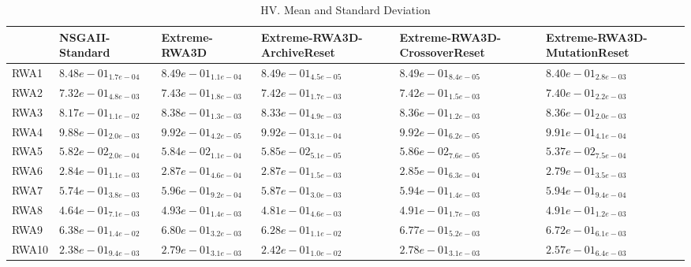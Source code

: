 \documentclass{article}
\begin{document}
\begin{table}
\caption{HV. Mean and Standard Deviation}
\label{table: HV}
\centering
\begin{scriptsize}
\begin{tabular}{llllll}
\hline & NSGAII-Standard & Extreme-RWA3D & Extreme-RWA3D-ArchiveReset & Extreme-RWA3D-CrossoverReset &  Extreme-RWA3D-MutationReset\\
\hline 
RWA1 & $  8.48e-01_{ 1.7e-04}$ & $  8.49e-01_{ 1.1e-04}$ & \cellcolor{gray95}$  8.49e-01_{ 4.5e-05}$ & \cellcolor{gray25}$  8.49e-01_{ 8.4e-05}$ & $  8.40e-01_{ 2.8e-03}$ \\
RWA2 & $  7.32e-01_{ 4.8e-03}$ & \cellcolor{gray95}$  7.43e-01_{ 1.8e-03}$ & \cellcolor{gray25}$  7.42e-01_{ 1.7e-03}$ & $  7.42e-01_{ 1.5e-03}$ & $  7.40e-01_{ 2.2e-03}$ \\
RWA3 & $  8.17e-01_{ 1.1e-02}$ & \cellcolor{gray95}$  8.38e-01_{ 1.3e-03}$ & $  8.33e-01_{ 4.9e-03}$ & $  8.36e-01_{ 1.2e-03}$ & \cellcolor{gray25}$  8.36e-01_{ 2.0e-03}$ \\
RWA4 & $  9.88e-01_{ 2.0e-03}$ & \cellcolor{gray95}$  9.92e-01_{ 4.2e-05}$ & $  9.92e-01_{ 3.1e-04}$ & \cellcolor{gray25}$  9.92e-01_{ 6.2e-05}$ & $  9.91e-01_{ 4.1e-04}$ \\
RWA5 & $  5.82e-02_{ 2.0e-04}$ & $  5.84e-02_{ 1.1e-04}$ & \cellcolor{gray25}$  5.85e-02_{ 5.1e-05}$ & \cellcolor{gray95}$  5.86e-02_{ 7.6e-05}$ & $  5.37e-02_{ 7.5e-04}$ \\
RWA6 & $  2.84e-01_{ 1.1e-03}$ & \cellcolor{gray25}$  2.87e-01_{ 4.6e-04}$ & \cellcolor{gray95}$  2.87e-01_{ 1.5e-03}$ & $  2.85e-01_{ 6.3e-04}$ & $  2.79e-01_{ 3.5e-03}$ \\
RWA7 & $  5.74e-01_{ 3.8e-03}$ & \cellcolor{gray95}$  5.96e-01_{ 9.2e-04}$ & $  5.87e-01_{ 3.0e-03}$ & $  5.94e-01_{ 1.4e-03}$ & \cellcolor{gray25}$  5.94e-01_{ 9.4e-04}$ \\
RWA8 & $  4.64e-01_{ 7.1e-03}$ & \cellcolor{gray95}$  4.93e-01_{ 1.4e-03}$ & $  4.81e-01_{ 4.6e-03}$ & \cellcolor{gray25}$  4.91e-01_{ 1.7e-03}$ & $  4.91e-01_{ 1.2e-03}$ \\
RWA9 & $  6.38e-01_{ 1.4e-02}$ & \cellcolor{gray95}$  6.80e-01_{ 3.2e-03}$ & $  6.28e-01_{ 1.1e-02}$ & \cellcolor{gray25}$  6.77e-01_{ 5.2e-03}$ & $  6.72e-01_{ 6.1e-03}$ \\
RWA10 & $  2.38e-01_{ 9.4e-03}$ & \cellcolor{gray95}$  2.79e-01_{ 3.1e-03}$ & $  2.42e-01_{ 1.0e-02}$ & \cellcolor{gray25}$  2.78e-01_{ 3.1e-03}$ & $  2.57e-01_{ 6.4e-03}$ \\
\hline
\end{tabular}
\end{scriptsize}
\end{table}
\end{document}
